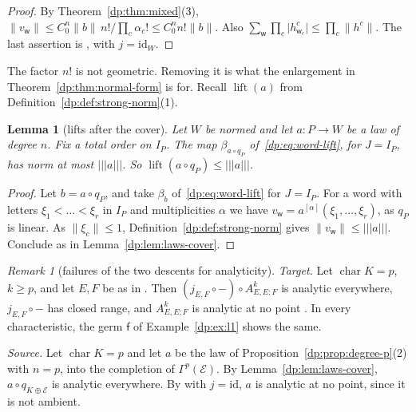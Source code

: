 \documentclass[11pt]{amsart}
\newtheorem{lemma}[theorem]{Lemma}
\theoremstyle{definition}
\theoremstyle{remark}
\newtheorem{remark}[theorem]{Remark}
\numberwithin{equation}{section}
\newcommand{\id}{\mathrm{id}}
\newcommand{\abs}[1]{\lvert #1\rvert}
\newcommand{\norm}[1]{\lVert #1\rVert}
\theoremstyle{plain}
\theoremstyle{definition}
\theoremstyle{plain}
\begin{document}
\begin{proof}
By Theorem~\ref{dp:thm:mixed}(3), $\norm{v_{\mathsf w}}\le C_0^n\norm b\,n!/\prod_c\alpha_c!\le C_0^nn!\norm b$. Also $\sum_{\mathsf w}\prod_c\abs{h^c_{\mathsf w_c}}\le\prod_c\norm{h^c}$. The last assertion is \cite[Proposition~2.5]{I}, with $j=\id_W$.
\end{proof}

The factor $n!$ is not geometric. Removing it is what the enlargement in Theorem~\ref{dp:thm:normal-form} is for. Recall $\operatorname{lift}(a)$ from Definition~\ref{dp:def:strong-norm}(1).

\begin{lemma}[lifts after the cover]\label{dp:lem:lift-cover}
Let $W$ be normed and let $a\colon P\to W$ be a law of degree $n$. Fix a total order on $I_P$. The map $\beta_{a\circ q_P}$ of~\eqref{dp:eq:word-lift}, for $J=I_P$, has norm at most $\lvert\!\lvert\!\lvert a\rvert\!\rvert\!\rvert$. So $\operatorname{lift}(a\circ q_P)\le\lvert\!\lvert\!\lvert a\rvert\!\rvert\!\rvert$.
\end{lemma}

\begin{proof}
Let $b=a\circ q_P$, and take $\beta_b$ of~\eqref{dp:eq:word-lift} for $J=I_P$. For a word with letters $\xi_1<\dots<\xi_r$ in $I_P$ and multiplicities $\alpha$ we have $v_{\mathsf w}=a^{[\alpha]}(\xi_1,\dots,\xi_r)$, as $q_P$ is linear. As $\norm{\xi_c}\le1$, Definition~\ref{dp:def:strong-norm} gives $\norm{v_{\mathsf w}}\le\lvert\!\lvert\!\lvert a\rvert\!\rvert\!\rvert$. Conclude as in Lemma~\ref{dp:lem:laws-cover}.
\end{proof}

\begin{remark}[failures of the two descents for analyticity]\label{dp:rem:an-no-descent}
\emph{Target.} Let $\operatorname{char}K=p$, $k\ge p$, and let $E,F$ be as in \cite[Theorem~7.2(1)]{I}. Then $(j_{E,F}\circ{-})\circ A^k_{E,E;F}$ is analytic everywhere, $j_{E,F}\circ{-}$ has closed range, and $A^k_{E,E;F}$ is analytic at no point \cite[Remark~14.13]{I}. In every characteristic, the germ $\mathsf f$ of Example~\ref{dp:ex:l1} shows the same.

\emph{Source.} Let $\operatorname{char}K=p$ and let $a$ be the law of Proposition~\ref{dp:prop:degree-p}(2) with $n=p$, into the completion of $\Gamma^p(\mathcal E)$. By Lemma~\ref{dp:lem:laws-cover}, $a\circ q_{K\oplus\mathcal E}$ is analytic everywhere. By \cite[Proposition~14.9(2)]{I} with $j=\id$, $a$ is analytic at no point, since it is not ambient.
\end{remark}
\end{document}
